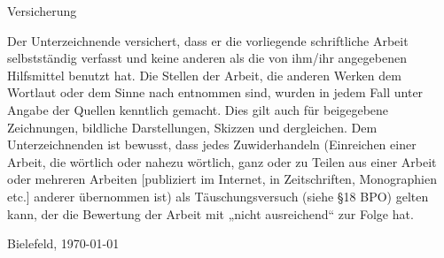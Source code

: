 \thispagestyle{empty}
{\fontsize{12}{12}
\begin{center}
{\huge Versicherung}
\end{center}
}
\vspace{3cm}

\setlength{\parindent}{0in}

Der Unterzeichnende versichert, dass er die vorliegende schriftliche Arbeit selbstständig
verfasst und keine anderen als die von ihm/ihr angegebenen Hilfsmittel
benutzt hat. Die Stellen der Arbeit, die anderen Werken dem Wortlaut oder dem
Sinne nach entnommen sind, wurden in jedem Fall unter Angabe der Quellen
kenntlich gemacht. Dies gilt auch für beigegebene Zeichnungen, bildliche Darstellungen,
Skizzen und dergleichen. Dem Unterzeichnenden ist bewusst, dass
jedes Zuwiderhandeln (Einreichen einer Arbeit, die wörtlich oder nahezu wörtlich,
ganz oder zu Teilen aus einer Arbeit oder mehreren Arbeiten [publiziert im
Internet, in Zeitschriften, Monographien etc.] anderer übernommen ist) als Täuschungsversuch
(siehe §18 BPO) gelten kann, der die Bewertung der Arbeit mit
„nicht ausreichend“ zur Folge hat.

\vspace{4cm}

Bielefeld, \today

\vspace{1cm}
\theauthor
